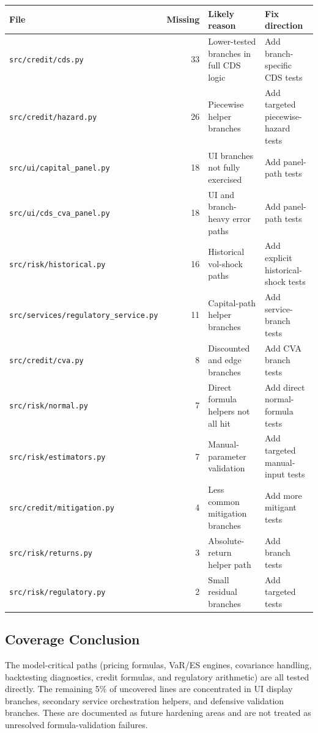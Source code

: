\documentclass[11pt]{article}
\newcommand{\code}[1]{\texttt{#1}}
\begin{document}
\begin{center}
\footnotesize
\begin{tabular}{L{4.2cm}rL{3.8cm}L{4.2cm}}
\toprule
\textbf{File} & \textbf{Missing} & \textbf{Likely reason} & \textbf{Fix direction} \\
\midrule
\code{src/credit/cds.py}                  & 33 & Lower-tested branches in full CDS logic & Add branch-specific CDS tests \\
\code{src/credit/hazard.py}               & 26 & Piecewise helper branches & Add targeted piecewise-hazard tests \\
\code{src/ui/\allowbreak capital\_panel.py}& 18 & UI branches not fully exercised & Add panel-path tests \\
\code{src/ui/\allowbreak cds\_cva\_panel.py}& 18 & UI and branch-heavy error paths & Add panel-path tests \\
\code{src/risk/historical.py}             & 16 & Historical vol-shock paths & Add explicit historical-shock tests \\
\code{src/services/\allowbreak regulatory\_\allowbreak service.py}& 11 & Capital-path helper branches & Add service-branch tests \\
\code{src/credit/cva.py}                  &  8 & Discounted and edge branches & Add CVA branch tests \\
\code{src/risk/normal.py}                 &  7 & Direct formula helpers not all hit & Add direct normal-formula tests \\
\code{src/risk/\allowbreak estimators.py}  &  7 & Manual-parameter validation & Add targeted manual-input tests \\
\code{src/credit/\allowbreak mitigation.py}&  4 & Less common mitigation branches & Add more mitigant tests \\
\code{src/risk/returns.py}                &  3 & Absolute-return helper path & Add branch tests \\
\code{src/risk/\allowbreak regulatory.py}  &  2 & Small residual branches & Add targeted tests \\
\bottomrule
\end{tabular}
\end{center}

\subsection{Coverage Conclusion}

The model-critical paths (pricing formulas, VaR/ES engines, covariance
handling, backtesting diagnostics, credit formulas, and regulatory
arithmetic) are all tested directly.  The remaining 5\% of uncovered
lines are concentrated in UI display branches, secondary service
orchestration helpers, and defensive validation branches.  These are
documented as future hardening areas and are not treated as unresolved
formula-validation failures.
\end{document}
